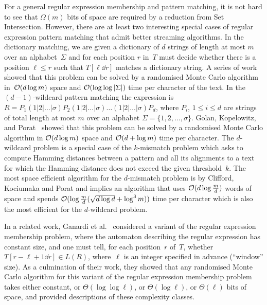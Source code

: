For a general regular expression membership and pattern matching, it is not hard to see that $\Omega(m)$ bits of
space are required by a reduction from Set Intersection.
However, there are at least two interesting special cases of regular expression pattern matching that admit better streaming algorithms.
In the dictionary matching, we are given a dictionary of $d$ strings of length at most $m$ over an alphabet~$\Sigma$ and for each position $r$ in~$T$ must decide whether there is a position $\ell \le r$ such that $T[\ell \dd r]$ matches a dictionary string. A series of work~\cite{Porat:09,pattern_match_BG14,DBLP:conf/esa/CliffordFPSS15,DBLP:conf/esa/GolanP17,DBLP:conf/icalp/GolanKP18} showed that this problem can be solved by a randomised Monte Carlo algorithm in~$\mathcal{O}(d \log m)$ space and $\mathcal{O}(\log \log |\Sigma|) $ time per character of the text.
In the $(d-1)$-wildcard pattern matching the expression is~$R = P_1 (1|2|\ldots|\sigma) P_2 (1|2|\ldots|\sigma) \ldots (1|2|\ldots|\sigma) P_{d}$, where $P_i$, $1 \le i \le d$ are strings of total length at most $m$ over an alphabet $\Sigma = \{1,2,\ldots,\sigma\}$. Golan, Kopelowitz, and Porat~\cite{DBLP:journals/algorithmica/GolanKP19} showed that this problem can be solved by a randomised Monte Carlo algorithm in $\mathcal{O}(d \log m)$ space and $\mathcal{O}(d+\log m)$ time per character.
The $d$-wildcard problem is a special case of the $k$-mismatch problem which asks to compute Hamming distances between a pattern and all its alignments to a text for which the Hamming distance does not exceed the given threshold~$k$.
The most space efficient algorithm for the $d$-mismatch problem is by Clifford, Kociumaka and Porat \cite{clifford2018streaming} and implies an algorithm that uses $\mathcal{O}(d\log \frac{m}{d})$ words of space and spends $\mathcal{O}(\log\frac{m}{d}(\sqrt{d\log d}+\log^3m))$ time per character which is also the most efficient for the $d$-wildcard problem.

In a related work, Ganardi et al.~\cite{ganardi_et_al:LIPIcs:2018:9131,DBLP:conf/lata/GanardiHL18,ganardi_et_al:LIPIcs:2018:8485,ganardi_et_al:LIPIcs:2016:6853} considered a variant of the regular expression membership problem, where the automaton describing the regular expression has constant size, and one must tell, for each position~$r$ of~$T$, whether $T[r-\ell+1\dd r] \in L(R)$, where~$\ell$ is an integer specified in advance (``window'' size). As a culmination of their work, they showed that any randomised Monte Carlo algorithm for this variant of the regular expression membership problem takes either constant, or $\Theta(\log\log \ell)$, or $\Theta(\log \ell)$, or $\Theta(\ell)$ bits of space, and provided descriptions of these complexity classes.

